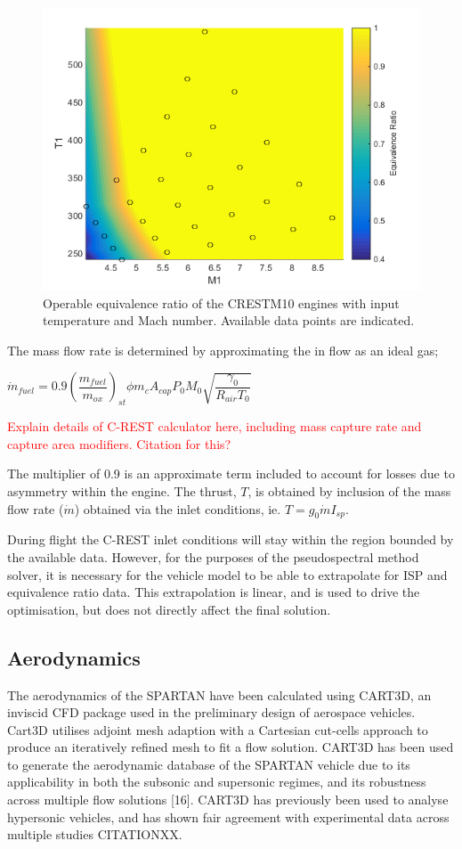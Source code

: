 \begin{figure}[ht]
	\centering
	\includegraphics[width=0.6\linewidth]{figures/3_vehicle_design/EquivalenceRatioInterp}
	\caption{Operable equivalence ratio of the CRESTM10 engines with input temperature and Mach number. Available data points are indicated.}
	\label{fig:EquivalenceRatioInterp}
\end{figure}
The mass flow rate is determined by approximating the in flow as an ideal gas; 

$\dot{m}_{fuel} = 0.9 (\dfrac{m_{fuel}}{m_{ox}} )_{st} \phi m_c A_{cap} P_0 M_0 \sqrt{\dfrac{\gamma_0}{R_{air} T_0}}$

\textcolor{red}{Explain details of C-REST calculator here, including mass capture rate and capture area modifiers. Citation for this?}

The multiplier of 0.9 is an approximate term included to account for losses due to asymmetry within the engine. 
The thrust, $T$, is obtained by inclusion of the mass flow rate ($\dot{m}$) obtained via the inlet conditions, ie. $T = g_0\dot{m}I_{sp}$. 

During flight the C-REST inlet conditions will stay within the region bounded by the available data. However, for the purposes of the pseudospectral method solver, it is necessary for the vehicle model to be able to extrapolate for ISP and equivalence ratio data. This extrapolation is linear, and is used to drive the optimisation, but does not directly affect the final solution. 





		
		
		\subsection{Aerodynamics}
		
		The aerodynamics of the SPARTAN have been calculated using CART3D, an inviscid CFD package used in the preliminary design of aerospace vehicles. Cart3D utilises adjoint mesh adaption with a Cartesian cut-cells approach to produce an iteratively refined mesh to fit a flow solution. CART3D has
		been used to generate the aerodynamic database of the SPARTAN vehicle due to its applicability in both the subsonic
		and supersonic regimes, and its robustness across multiple flow solutions [16]. CART3D has previously been used to
		analyse hypersonic vehicles, and has shown fair agreement with experimental data across multiple studies CITATIONXX.
		
